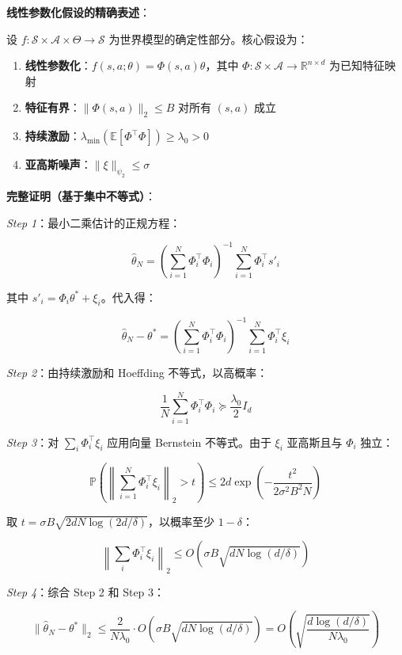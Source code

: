 \documentclass[UTF8]{ctexart}
\providecommand{\tightlist}{%
  \setlength{\itemsep}{0pt}\setlength{\parskip}{0pt}}
\begin{document}
\textbf{线性参数化假设的精确表述}：

设 \(f: \mathcal{S} \times \mathcal{A} \times \Theta \to \mathcal{S}\)
为世界模型的确定性部分。核心假设为：

\begin{enumerate}
\def\labelenumi{\arabic{enumi}.}
\tightlist
\item
  \textbf{线性参数化}：\(f(s,a;\theta) = \Phi(s,a)\theta\)，其中
  \(\Phi: \mathcal{S} \times \mathcal{A} \to \mathbb{R}^{n \times d}\)
  为已知特征映射
\item
  \textbf{特征有界}：\(\|\Phi(s,a)\|_2 \leq B\) 对所有 \((s,a)\) 成立
\item
  \textbf{持续激励}：\(\lambda_{\min}(\mathbb{E}[\Phi^\top \Phi]) \geq \lambda_0 > 0\)
\item
  \textbf{亚高斯噪声}：\(\|\xi\|_{\psi_2} \leq \sigma\)
\end{enumerate}

\textbf{完整证明（基于集中不等式）}：

\emph{Step 1}：最小二乘估计的正规方程：

\[
\hat{\theta}_N = \left(\sum_{i=1}^N \Phi_i^\top \Phi_i\right)^{-1} \sum_{i=1}^N \Phi_i^\top s'_i
\]

其中 \(s'_i = \Phi_i \theta^* + \xi_i\)。代入得：

\[
\hat{\theta}_N - \theta^* = \left(\sum_{i=1}^N \Phi_i^\top \Phi_i\right)^{-1} \sum_{i=1}^N \Phi_i^\top \xi_i
\]

\emph{Step 2}：由持续激励和 Hoeffding 不等式，以高概率：

\[
\frac{1}{N}\sum_{i=1}^N \Phi_i^\top \Phi_i \succeq \frac{\lambda_0}{2} I_d
\]

\emph{Step 3}：对 \(\sum_i \Phi_i^\top \xi_i\) 应用向量 Bernstein
不等式。由于 \(\xi_i\) 亚高斯且与 \(\Phi_i\) 独立：

\[
\mathbb{P}\left(\left\|\sum_{i=1}^N \Phi_i^\top \xi_i\right\|_2 > t\right) \leq 2d \exp\left(-\frac{t^2}{2\sigma^2 B^2 N}\right)
\]

取 \(t = \sigma B \sqrt{2dN\log(2d/\delta)}\)，以概率至少 \(1-\delta\)：

\[
\left\|\sum_i \Phi_i^\top \xi_i\right\|_2 \leq O(\sigma B\sqrt{dN\log(d/\delta)})
\]

\emph{Step 4}：综合 Step 2 和 Step 3：

\[
\|\hat{\theta}_N - \theta^*\|_2 \leq \frac{2}{N\lambda_0} \cdot O(\sigma B\sqrt{dN\log(d/\delta)}) = O\left(\sqrt{\frac{d\log(d/\delta)}{N\lambda_0}}\right)
\]
\end{document}
